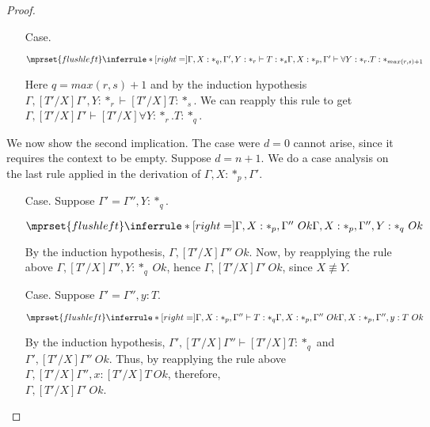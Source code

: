 \begin{proof}
\begin{itemize}
  \item[Case.]\ \\
    \begin{center}
      \begin{math}
        $$\mprset{flushleft}
        \inferrule* [right=] {
          \Gamma,X : *_q,\Gamma',Y:*_r \vdash T : *_s
        }{\Gamma,X:*_p,\Gamma' \vdash \forall Y:*_r.T : *_{max(r,s)+1}}
      \end{math}
    \end{center}
    Here $q = max(r,s) + 1$ and by the induction hypothesis 
    $\Gamma,[T'/X]\Gamma',Y:*_r \vdash [T'/X]T:*_s$.  We can reapply this rule to get 
    $\Gamma,[T'/X]\Gamma' \vdash [T'/X] \forall Y:*_r.T:*_q$.
  \end{itemize}

  \noindent We now show the second implication.
  The case were $d = 0$ cannot arise, since it requires the context to be empty.
  Suppose $d = n + 1$.  We do a case analysis on the last rule applied in the derivation of 
  $\Gamma,X:*_p,\Gamma'$.
  \begin{itemize}
  \item[Case.] Suppose $\Gamma' = \Gamma'',Y:*_q$.\ \\
    \begin{center}
      \begin{math}
        $$\mprset{flushleft}
        \inferrule* [right=] {
          \Gamma,X:*_p,\Gamma''\ Ok
        }{\Gamma,X:*_p,\Gamma'',Y:*_q\ Ok}
      \end{math}
    \end{center}
    By the induction hypothesis, $\Gamma,[T'/X]\Gamma''\ Ok$.  Now, by reapplying
    the rule above $\Gamma,[T'/X]\Gamma'',Y:*_q\ Ok$, hence $\Gamma,[T'/X]\Gamma'\ Ok$, 
    since $X \not \equiv Y$.
  \item[Case.]Suppose $\Gamma' = \Gamma'',y:T$.\ \\
    \begin{center}
      \begin{math}
        $$\mprset{flushleft}
        \inferrule* [right=] {
          \Gamma,X:*_p,\Gamma'' \vdash T:*_q
          \\
          \Gamma,X:*_p,\Gamma''\ Ok
        }{\Gamma,X:*_p,\Gamma'',y :T\ Ok}
      \end{math} 
    \end{center}
    By the induction hypothesis, $\Gamma',[T'/X]\Gamma'' \vdash [T'/X]T:*_q$ and 
    $\Gamma',[T'/X]\Gamma''\ Ok$.  Thus,
    by reapplying the rule above $\Gamma,[T'/X]\Gamma'',x:[T'/X]T\ Ok$, therefore,\\
    $\Gamma,[T'/X]\Gamma'\ Ok$.
  \end{itemize}
\end{proof}

